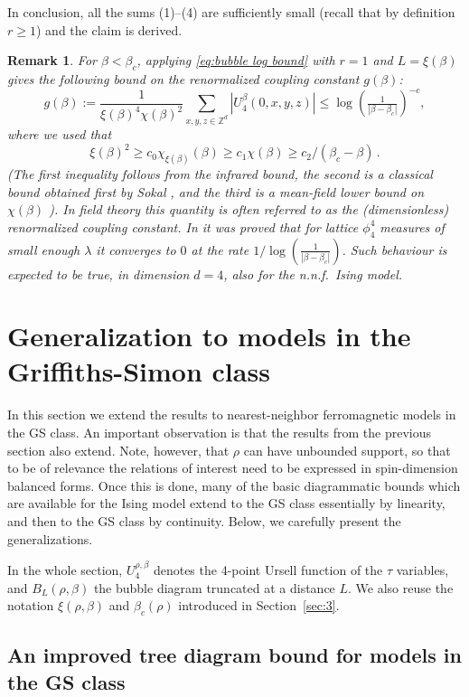 \documentclass[a4paper,oneside,11pt]{article}
\newtheorem{remark}[theorem]{Remark}
\numberwithin{equation}{section}
\numberwithin{equation}{section}
\numberwithin{equation}{section}
\newcommand{\bbZ}{\mathbb{Z}}
\begin{document}
In conclusion, all the sums (1)--(4) are sufficiently small (recall that by definition $r\ge1$) and the claim is derived. 
\begin{remark}
For $\beta<\beta_c$, applying \eqref{eq:bubble log bound} with $r=1$ and $L=\xi(\beta)$  gives the following bound on the {\em renormalized coupling constant} $g(\beta)$:
\begin{equation}\label{eq:RCC}
g(\beta):=\frac1{\xi(\beta)^4\chi(\beta)^2}\sum_{x,y,z\in \bbZ^d}|U_4^\beta(0,x,y,z)|\le \log(\tfrac1{|\beta-\beta_c|})^{-c},\end{equation}
where we used that 
\[\xi(\beta)^2\ge c_0\chi_{\xi(\beta)}(\beta)\ge c_1\chi(\beta)\ge c_2/(\beta_c-\beta) \,. \]
(The first inequality follows from the infrared bound, the second is a classical bound obtained first by Sokal \cite{Sok82}, and the third is a mean-field 
lower bound on $\chi(\beta)$ \cite{Aiz82}).
In field theory this quantity  is often referred to as the (dimensionless)  renormalized coupling constant.  In \cite{HarTas87} it was proved that for lattice $\phi^4_4$ measures of small enough $\lambda$ it  converges to $0$ at the rate $1/\log(\tfrac1{|\beta-\beta_c|})$.  Such behaviour is  expected to be true, in  dimension $d=4$, also for the n.n.f.~Ising model.
\end{remark}

\section{Generalization to models in the Griffiths-Simon class}\label{sec:6}

In this section we extend the results to nearest-neighbor ferromagnetic models in the GS class. 
An important observation is that  the results from the previous section also extend. 
Note, however, that $\rho$ can have unbounded support, so that to be of relevance the  relations of interest need to be expressed in spin-dimension balanced forms. 
Once this is done, many of the basic diagrammatic bounds which are available for the Ising model extend to the GS class essentially by linearity, and then to the GS class by continuity.   
Below, we carefully present the generalizations.

In the whole section, $U_4^{\rho,\beta}$ denotes the 4-point Ursell function of the $\tau$ variables, and $B_L(\rho,\beta)$ the bubble diagram truncated at a distance $L$. We also reuse the notation $\xi(\rho,\beta)$ and $\beta_c(\rho)$ introduced in Section~\ref{sec:3}.


\subsection{An improved tree diagram bound for models in the GS class}
 
\end{document}
